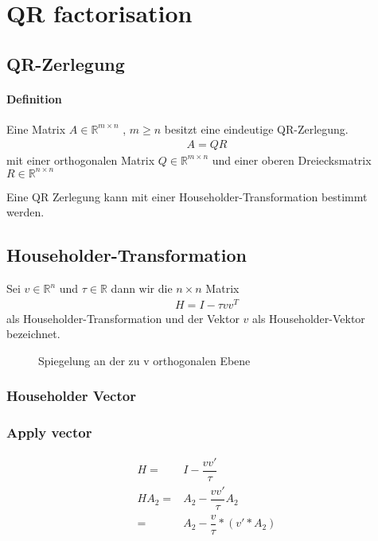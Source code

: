 \chapter{QR factorisation}

\section{QR-Zerlegung}
\subsubsection{Definition}
Eine Matrix $A \in \mathbb{R}^{m \times n}$ , $m \ge n$ besitzt eine eindeutige QR-Zerlegung.
\begin{align}
	A = QR
\end{align}
mit einer orthogonalen Matrix $ Q \in \mathbb{R}^{m \times n} $ und einer oberen Dreiecksmatrix $ R \in \mathbb{R}^{n \times n}$ 


Eine QR Zerlegung kann mit einer Householder-Transformation bestimmt werden.

\section{Householder-Transformation}
Sei $v \in \mathbb{R}^n$ und $\tau \in \mathbb{R}$ dann wir die $n \times n$ Matrix 
\begin{align}
	H = I - \tau v v^T
\end{align}
als Householder-Transformation und der Vektor $v$ als Householder-Vektor bezeichnet.
\begin{figure} 
	
	\caption{Spiegelung an der zu v orthogonalen Ebene }
	\label{fig:HHolder}
\end{figure}
\subsection{Householder Vector}
\subsection{Apply vector}
\begin{align}
H =& I - \dfrac{vv'}{\tau}\\ 
H A_2 =& A_2 - \dfrac{vv'}{\tau}A_2\\
=& A_2 - \dfrac{v}{\tau}*(v'*A_2)
\end{align}

